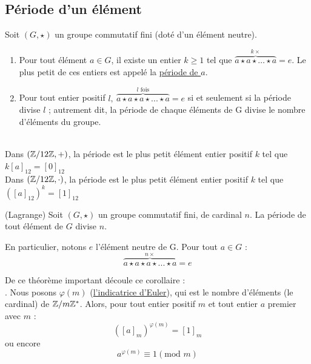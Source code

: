 \documentclass[11pt,a4paper]{article}
\begin{document}
\subsection{Période d'un élément}
Soit $(G,\star)$ un groupe commutatif fini (doté d'un élément neutre).
\begin{enumerate}
	\item Pour tout élément $a \in G$, il existe un entier $k \geq 1$ tel que $\overbrace{a\star a \star \ldots \star a}^{k\times} = e$. Le plus petit de ces entiers est appelé la \uline{période de $a$}.
	\item Pour tout entier positif $l,\ \overbrace{a\star a\star a \star...\star a}^{l\text{ fois}} = e$ si et seulement si la période divise $l$ ; autrement dit, la période de chaque éléments de G divise le nombre d'éléments du groupe.
\end{enumerate}
\begin{exemple}[0.85]~\\
	Dans $(\mathbb{Z}/12\mathbb{Z},+)$, la période est le plus petit élément entier positif $k$ tel que $k[a]_{12} = [0]_{12}$\\
	Dans $(\mathbb{Z}/12\mathbb{Z},\cdot)$, la période est le plus petit élément entier positif $k$ tel que $([a]_{12})^k = [1]_{12}$
\end{exemple}
 (Lagrange) Soit $(G,\star)$ un groupe commutatif fini, de cardinal $n$. La période de tout élément de $G$ divise $n$.

En particulier, notons $e$ l'élément neutre de G. Pour tout $a  \in G$ : \[\overbrace{a\star a \star a \star...\star a}^{n\times} = e\]

De ce théorème important découle ce corollaire :\\
. Nous posons $\varphi(m)$ (\uline{l'indicatrice d'Euler}), qui est le nombre d'éléments (le cardinal) de $\mathbb{Z}/m\mathbb{Z}^*$.  Alors, pour tout entier positif $m$ et tout entier $a$ premier avec $m$ :
\[([a]_m)^{\varphi(m)} = [1]_m\]
ou encore
\[a^{\varphi(m)} \equiv 1 (\text{mod }m)\]
\newpage
\end{document}
